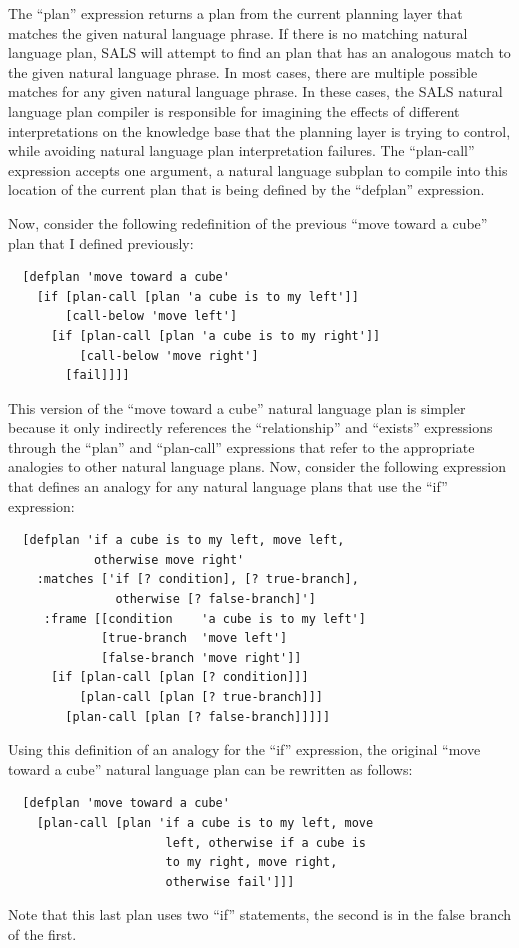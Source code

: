 The ``plan'' expression returns a plan from the current planning layer
that matches the given natural language phrase.  If there is no
matching natural language plan, SALS will attempt to find an plan that
has an analogous match to the given natural language phrase.  In most
cases, there are multiple possible matches for any given natural
language phrase.  In these cases, the SALS natural language plan
compiler is responsible for imagining the effects of different
interpretations on the knowledge base that the planning layer is
trying to control, while avoiding natural language plan interpretation
failures.  The ``plan-call'' expression accepts one argument, a
natural language subplan to compile into this location of the current
plan that is being defined by the ``defplan'' expression.

Now, consider the following redefinition of the previous ``move toward
a cube'' plan that I defined previously:
\begin{samepage}
\begin{Verbatim}
  [defplan 'move toward a cube'
    [if [plan-call [plan 'a cube is to my left']]
        [call-below 'move left']
      [if [plan-call [plan 'a cube is to my right']]
          [call-below 'move right']
        [fail]]]]
\end{Verbatim}
\end{samepage}
This version of the ``move toward a cube'' natural language plan is
simpler because it only indirectly references the ``relationship'' and
``exists'' expressions through the ``plan'' and ``plan-call''
expressions that refer to the appropriate analogies to other natural
language plans.  Now, consider the following expression that defines
an analogy for any natural language plans that use the ``if''
expression:
\begin{samepage}
\begin{Verbatim}
  [defplan 'if a cube is to my left, move left,
            otherwise move right'
    :matches ['if [? condition], [? true-branch],
               otherwise [? false-branch]']
     :frame [[condition    'a cube is to my left']
             [true-branch  'move left']
             [false-branch 'move right']]
      [if [plan-call [plan [? condition]]]
          [plan-call [plan [? true-branch]]]
        [plan-call [plan [? false-branch]]]]]
\end{Verbatim}
\end{samepage}
Using this definition of an analogy for the ``if'' expression, the
original ``move toward a cube'' natural language plan can be rewritten
as follows:
\begin{samepage}
\begin{Verbatim}
  [defplan 'move toward a cube'
    [plan-call [plan 'if a cube is to my left, move
                      left, otherwise if a cube is
                      to my right, move right,
                      otherwise fail']]]
\end{Verbatim}
\end{samepage}
Note that this last plan uses two ``if'' statements, the second is in
the false branch of the first.

